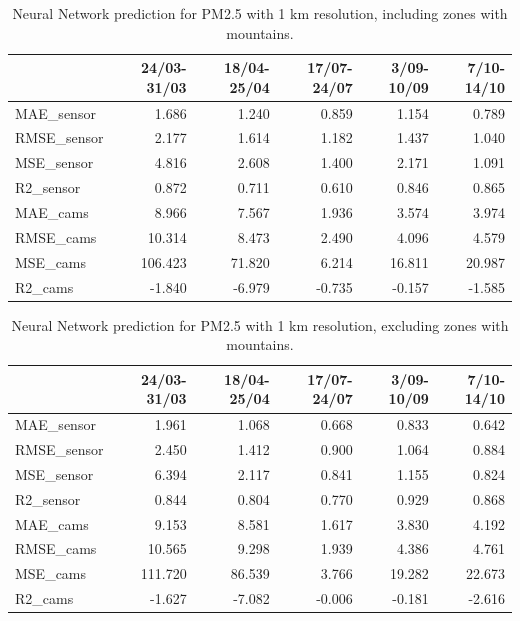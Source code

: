 \begin{table}[H]
\begin{tabular}{lrrrrr}
\toprule
  &  24/03-31/03 &  18/04-25/04 &  17/07-24/07 &  3/09-10/09 &  7/10-14/10 \\
\midrule
 MAE\_sensor &        1.686 &        1.240 &        0.859 &       1.154 &       0.789 \\
RMSE\_sensor &        2.177 &        1.614 &        1.182 &       1.437 &       1.040 \\
 MSE\_sensor &        4.816 &        2.608 &        1.400 &       2.171 &       1.091 \\
  R2\_sensor &        0.872 &        0.711 &        0.610 &       0.846 &       0.865 \\
   MAE\_cams &        8.966 &        7.567 &        1.936 &       3.574 &       3.974 \\
  RMSE\_cams &       10.314 &        8.473 &        2.490 &       4.096 &       4.579 \\
   MSE\_cams &      106.423 &       71.820 &        6.214 &      16.811 &      20.987 \\
    R2\_cams &       -1.840 &       -6.979 &       -0.735 &      -0.157 &      -1.585 \\
\bottomrule
\end{tabular}
\caption{Neural Network prediction for PM2.5 with 1 km resolution, including zones with mountains.}
\end{table}


\begin{table}[H]
\begin{tabular}{lrrrrr}
\toprule
  &  24/03-31/03 &  18/04-25/04 &  17/07-24/07 &  3/09-10/09 &  7/10-14/10 \\
\midrule
 MAE\_sensor &        1.961 &        1.068 &        0.668 &       0.833 &       0.642 \\
RMSE\_sensor &        2.450 &        1.412 &        0.900 &       1.064 &       0.884 \\
 MSE\_sensor &        6.394 &        2.117 &        0.841 &       1.155 &       0.824 \\
  R2\_sensor &        0.844 &        0.804 &        0.770 &       0.929 &       0.868 \\
   MAE\_cams &        9.153 &        8.581 &        1.617 &       3.830 &       4.192 \\
  RMSE\_cams &       10.565 &        9.298 &        1.939 &       4.386 &       4.761 \\
   MSE\_cams &      111.720 &       86.539 &        3.766 &      19.282 &      22.673 \\
    R2\_cams &       -1.627 &       -7.082 &       -0.006 &      -0.181 &      -2.616 \\
\bottomrule
\end{tabular}
\caption{Neural Network prediction for PM2.5 with 1 km resolution, excluding zones with mountains.}
\end{table}


